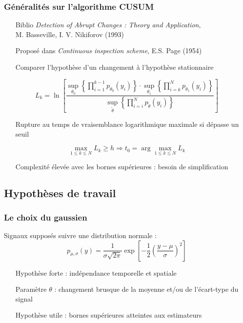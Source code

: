 \documentclass{beamer}
\begin{document}
\begin{frame}
	\frametitle{Généralités sur l'algorithme CUSUM}
	\begin{itemize}
		\item[Biblio] \emph{Detection of Abrupt Changes : Theory and Application},\\
		M. Basseville, I. V. Nikiforov (1993)
		\item[Proposé] dans \emph{Continuous inspection scheme}, E.S. Page (1954)
		\item[Comparer] l'hypothèse d'un changement à l'hypothèse stationnaire
	\end{itemize}
	\begin{equation}
		L _k =\ln \left[ \frac{\sup_{\theta_0}\left\{ \prod_{i=1}^{k-1} p_{\theta_0}(y_i) \right\} \cdot \sup_{\theta_1} \left\{ \prod_{i = k}^{N}p_{\theta_1}(y_i) \right\}}{\sup_{\tilde\theta}\left\{\prod_{i=i}^{N}p_{\tilde{\theta}}(y_i)\right\}} \right]
	\end{equation}
	\begin{itemize}
		\item[Rupture] au temps de vraisemblance logarithmique maximale si dépasse un seuil
	\end{itemize}
	\begin{equation}
		\max_{1 \leq k \leq N} L_k \geq h \Rightarrow t_0 = \arg \max_{1 \leq k \leq N} L_k
	\end{equation}
	\begin{itemize}
		\item[Complexité] élevée avec les bornes supérieures : besoin de simplification
	\end{itemize}
\end{frame}

\subsection{Hypothèses de travail}

\begin{frame}
	\frametitle{Le choix du gaussien}
	Signaux supposés suivre une distribution normale :
	\begin{equation}
		p_{\mu, \sigma}(y) = \frac1{\sigma\sqrt{2 \pi}} \exp \left[ -\frac12 \left( \frac{y - \mu}{\sigma} \right)^2 \right]
	\end{equation}
	\begin{itemize}
		\item[Hypothèse] forte : indépendance temporelle et spatiale
		\item[Paramètre] $\theta$ : changement brusque de la moyenne et/ou de l'écart-type du signal
		\item[Hypothèse] utile : bornes supérieures atteintes aux estimateurs
	\end{itemize}
\end{frame}
\end{document}
